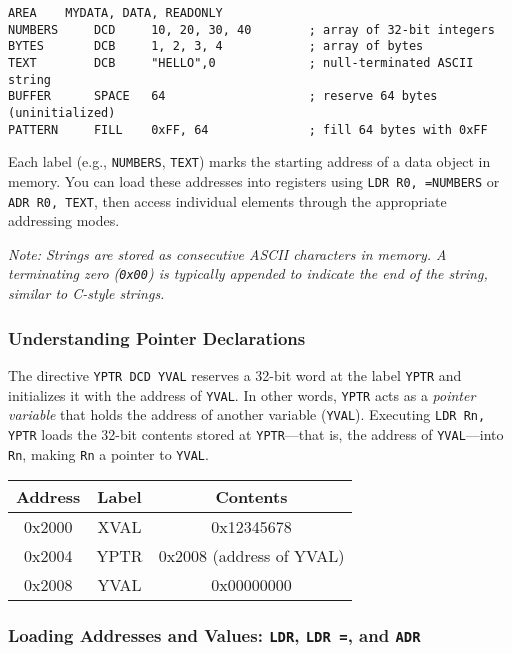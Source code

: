 \begin{lstlisting}[caption={Declaring arrays and strings in memory}]
            AREA    MYDATA, DATA, READONLY
NUMBERS     DCD     10, 20, 30, 40        ; array of 32-bit integers
BYTES       DCB     1, 2, 3, 4            ; array of bytes
TEXT        DCB     "HELLO",0             ; null-terminated ASCII string
BUFFER      SPACE   64                    ; reserve 64 bytes (uninitialized)
PATTERN     FILL    0xFF, 64              ; fill 64 bytes with 0xFF
\end{lstlisting}

Each label (e.g., \texttt{NUMBERS}, \texttt{TEXT}) marks the starting address of a data object in memory.  
You can load these addresses into registers using \texttt{LDR R0, =NUMBERS} or \texttt{ADR R0, TEXT}, then access individual elements through the appropriate addressing modes.

\noindent\textit{Note: Strings are stored as consecutive ASCII characters in memory. A terminating zero (\texttt{0x00}) is typically appended to indicate the end of the string, similar to C-style strings.}
\subsubsection{Understanding Pointer Declarations}
The directive \texttt{YPTR DCD YVAL} reserves a 32-bit word at the label \texttt{YPTR} and initializes it with the address of \texttt{YVAL}.  
In other words, \texttt{YPTR} acts as a \emph{pointer variable} that holds the address of another variable (\texttt{YVAL}).  
Executing \texttt{LDR Rn, YPTR} loads the 32-bit contents stored at \texttt{YPTR}—that is, the address of \texttt{YVAL}—into \texttt{Rn}, making \texttt{Rn} a pointer to \texttt{YVAL}.


\begin{center}
\begin{tabular}{|c|c|c|}
\hline
\textbf{Address} & \textbf{Label} & \textbf{Contents} \\
\hline
0x2000 & XVAL & 0x12345678 \\
0x2004 & YPTR & 0x2008 (address of YVAL) \\
0x2008 & YVAL & 0x00000000 \\
\hline
\end{tabular}
\end{center}


\subsubsection{Loading Addresses and Values: \texttt{LDR}, \texttt{LDR =}, and \texttt{ADR}}

